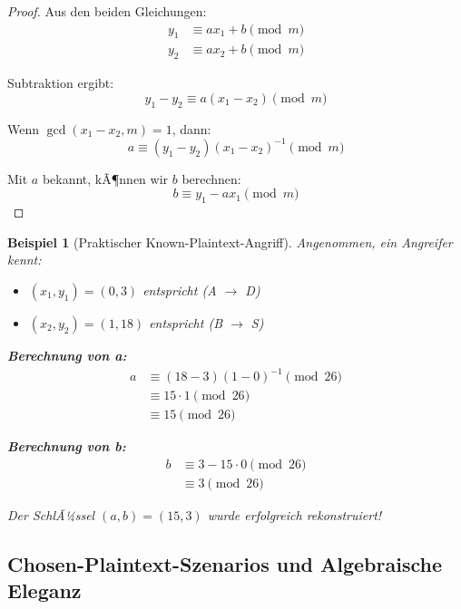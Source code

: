 ﻿\documentclass[12pt,a4paper]{article}
\newtheorem{example}{Beispiel}
\begin{document}
	\begin{proof}
		Aus den beiden Gleichungen:
		\begin{align}
			y_1 &\equiv ax_1 + b \pmod{m} \\
			y_2 &\equiv ax_2 + b \pmod{m}
		\end{align}
		
		Subtraktion ergibt:
		\begin{equation}
			y_1 - y_2 \equiv a(x_1 - x_2) \pmod{m}
		\end{equation}
		
		Wenn $\gcd(x_1 - x_2, m) = 1$, dann:
		\begin{equation}
			a \equiv (y_1 - y_2)(x_1 - x_2)^{-1} \pmod{m}
		\end{equation}
		
		Mit $a$ bekannt, kÃ¶nnen wir $b$ berechnen:
		\begin{equation}
			b \equiv y_1 - ax_1 \pmod{m}
		\end{equation}
	\end{proof}
	
	\begin{example}[Praktischer Known-Plaintext-Angriff]
		Angenommen, ein Angreifer kennt:
		\begin{itemize}
			\item $(x_1, y_1) = (0, 3)$ entspricht (A $\to$ D)
			\item $(x_2, y_2) = (1, 18)$ entspricht (B $\to$ S)
		\end{itemize}
		
		\textbf{Berechnung von a:}
		\begin{align}
			a &\equiv (18 - 3)(1 - 0)^{-1} \pmod{26} \\
			&\equiv 15 \cdot 1 \pmod{26} \\
			&\equiv 15 \pmod{26}
		\end{align}
		
		\textbf{Berechnung von b:}
		\begin{align}
			b &\equiv 3 - 15 \cdot 0 \pmod{26} \\
			&\equiv 3 \pmod{26}
		\end{align}
		
		Der SchlÃ¼ssel $(a, b) = (15, 3)$ wurde erfolgreich rekonstruiert!
	\end{example}
	
	\subsection{Chosen-Plaintext-Szenarios und Algebraische Eleganz}
	
\end{document}
